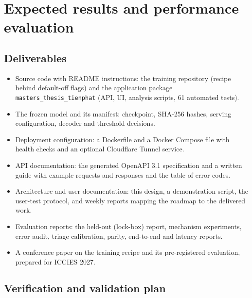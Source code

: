 \documentclass[11pt,a4paper]{article}
\begin{document}
\section{Expected results and performance evaluation}

\subsection{Deliverables}

\begin{itemize}
\item Source code with README instructions: the training repository (recipe behind default-off flags) and the application package \texttt{masters\_thesis\_tienphat} (API, UI, analysis scripts, 61 automated tests).
\item The frozen model and its manifest: checkpoint, SHA-256 hashes, serving configuration, decoder and threshold decisions.
\item Deployment configuration: a Dockerfile and a Docker Compose file with health checks and an optional Cloudflare Tunnel service.
\item API documentation: the generated OpenAPI 3.1 specification and a written guide with example requests and responses and the table of error codes.
\item Architecture and user documentation: this design, a demonstration script, the user-test protocol, and weekly reports mapping the roadmap to the delivered work.
\item Evaluation reports: the held-out (lock-box) report, mechanism experiments, error audit, triage calibration, parity, end-to-end and latency reports.
\item A conference paper on the training recipe and its pre-registered evaluation, prepared for ICCIES 2027.
\end{itemize}

\subsection{Verification and validation plan}
\end{document}
